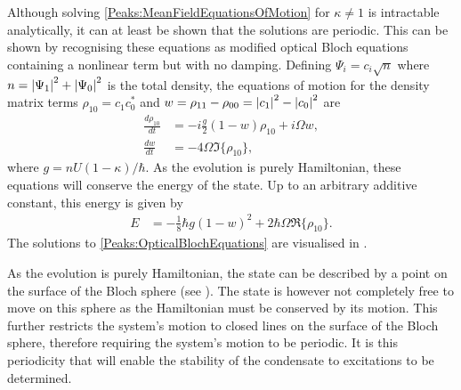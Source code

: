 Although solving \eqref{Peaks:MeanFieldEquationsOfMotion} for $\kappa \neq 1$ is intractable analytically, it can at least be shown that the solutions are periodic. This can be shown by recognising these equations as modified optical Bloch equations containing a nonlinear term but with no damping. Defining $\Psi_i = c_i\sqrt{n}$ where $n = \left|\Psi_1\right|^2 + \left|\Psi_0\right|^2$ is the total density, the equations of motion for the density matrix terms $\rho_{10} = c_{1}^{}c_{0}^*$ and $w = \rho_{11}-\rho_{00} = \left|c_1\right|^2 - \left|c_0\right|^2$ are
\begin{subequations}
    \label{Peaks:OpticalBlochEquations}
    \begin{align}
        \frac{d\rho_{10}}{dt} &= -i\frac{g}{2} (1-w)\rho_{10} + i \Omega w,\\
        \frac{d w}{dt} &= -4 \Omega \Im\{\rho_{10}\},
    \end{align}
\end{subequations}
where $g = n U (1-\kappa)/\hbar$. As the evolution is purely Hamiltonian, these equations will conserve the energy of the state. Up to an arbitrary additive constant, this energy is given by
\begin{align}
    E &= -\frac{1}{8}\hbar g(1 - w)^2 + 2 \hbar \Omega \Re\{\rho_{10}\}.
    \label{Peaks:OpticalBlochEnergy}
\end{align}
The solutions to \eqref{Peaks:OpticalBlochEquations} are visualised in .

As the evolution is purely Hamiltonian, the state can be described by a point on the surface of the Bloch sphere (see ).  The state is however not completely free to move on this sphere as the Hamiltonian must be conserved by its motion. This further restricts the system's motion to closed lines on the surface of the Bloch sphere, therefore requiring the system's motion to be periodic. It is this periodicity that will enable the stability of the condensate to excitations to be determined.

